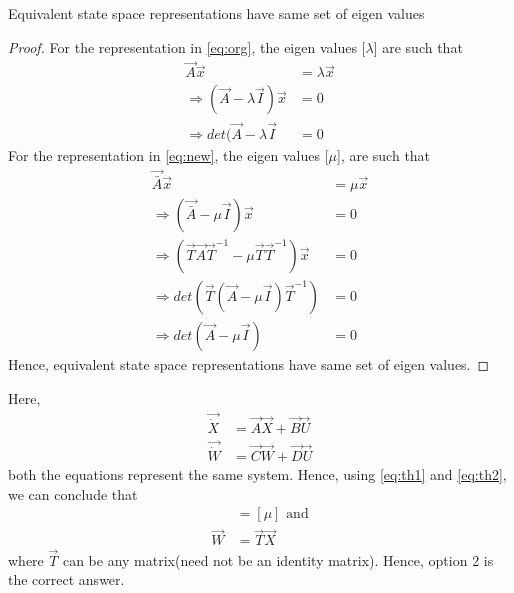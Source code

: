 \documentclass[journal,12pt,twocolumn]{IEEEtran}
\begin{document}
\begin{theorem}
Equivalent state space representations have same set of eigen values
\label{eq:th2}
\end{theorem}
\begin{proof}
For the representation in \eqref{eq:org}, the eigen values [$\lambda$] are such that
\begin{align}
    \vec{A}\vec{x}&=\lambda \vec{x}\\
    \Rightarrow(\vec{A}-\lambda \vec{I})\vec{x}&=0\\
    \Rightarrow det(\vec{A}-\lambda \vec{I}&=0
\end{align}
For the representation in \eqref{eq:new}, the eigen values [$\mu$], are such that
\begin{align}
    \vec{\bar A}\vec{x}&=\mu \vec{x}\\
    \Rightarrow(\vec{\bar A}-\mu \vec{I})\vec{x}&=0\\
    \Rightarrow(\vec{T}\vec{A}\vec{T}^{-1}-\mu \vec{T}\vec{T}^{-1})\vec{x}&=0\\
    \Rightarrow det(\vec{T}(\vec{A}-\mu \vec{I})\vec{T}^{-1})&=0\\
    \Rightarrow det(\vec{A}-\mu \vec{I})&=0
\end{align}
Hence, equivalent state space representations have same set of eigen values.
\end{proof}
Here,
\begin{align}
    \vec{\dot X}&=\vec{A}\vec{X}+\vec{B}\vec{U}\\
    \vec{\dot W}&=\vec{C}\vec{W}+\vec{D}\vec{U}
\end{align}
both the equations represent the same system. Hence, using \ref{eq:th1} and \ref{eq:th2}, we can conclude that
\begin{align}
    [\lambda]&=[\mu] \text{  and}\\
    \vec{W}&=\vec{T}\vec{X}
\end{align}
where $\vec{T}$ can be any matrix(need not be an identity matrix).
Hence, option 2 is the correct answer.
\end{document}
